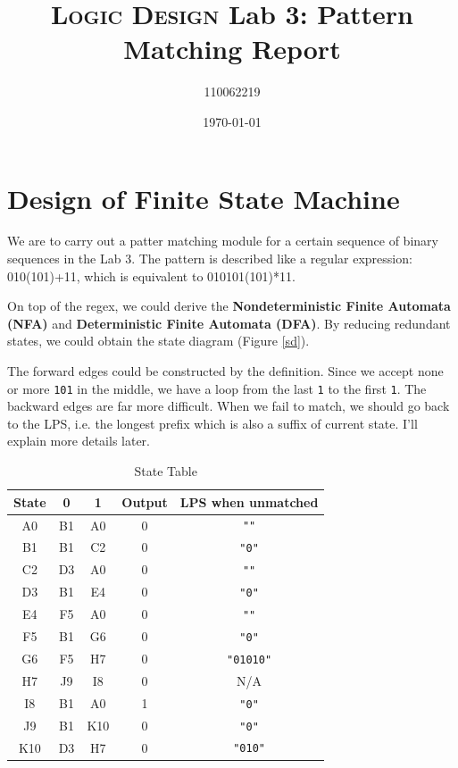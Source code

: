 \documentclass[12pt, a4paper]{article}
\title{\textsc{Logic Design} Lab 3: \textsf{\Large Pattern Matching} Report}
\author{110062219}
\date{\today}
\begin{document}
\maketitle

\section{Design of Finite State Machine}

We are to carry out a patter matching module for a certain sequence of binary sequences in the Lab 3. The pattern is described like a \textsf{regular expression}: \textsf{010(101)+11}, which is equivalent to \textsf{010101(101)*11}.

On top of the \textsf{regex}, we could derive the \textbf{Nondeterministic Finite Automata (NFA)} and \textbf{Deterministic Finite Automata (DFA)}. By reducing redundant states, we could obtain the state diagram (Figure \ref{sd}).

The forward edges could be constructed by the definition. Since we accept none or more \texttt{101} in the middle, we have a loop from the last \texttt{1} to the first \texttt{1}. The backward edges are far more difficult. When we fail to match, we should go back to the \textsf{LPS}, i.e. the longest prefix which is also a suffix of current state. I'll explain more details later.

\begin{table}[htbp]
\centering
\begin{tabular}{c|c|c|c|c}
State & 0 & 1 & Output & \textsf{LPS} when unmatched \\
\hline
A0 & B1 & A0 & 0 & \texttt{""} \\
B1 & B1 & C2 & 0 & \texttt{"0"} \\
C2 & D3 & A0 & 0 & \texttt{""} \\
D3 & B1 & E4 & 0 & \texttt{"0"} \\
E4 & F5 & A0 & 0 & \texttt{""} \\
F5 & B1 & G6 & 0 & \texttt{"0"} \\
G6 & F5 & H7 & 0 & \texttt{"01010"} \\
H7 & J9 & I8 & 0 & N/A \\
I8 & B1 & A0 & 1 & \texttt{"0"} \\
J9 & B1 & K10 & 0 & \texttt{"0"} \\
K10 & D3 & H7 & 0 & \texttt{"010"} \\
\end{tabular}
\caption[]{State Table\footnotemark}
\label{st}
\end{table}
\end{document}
